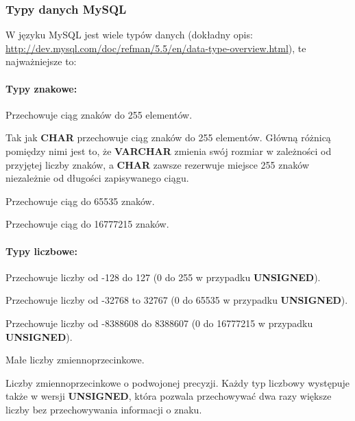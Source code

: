 \documentclass[a4paper,10pt]{article}
\renewenvironment{description}[1][0pt]
	{\list{}{\labelwidth=0pt \leftmargin=#1
	\let\makelabel\descriptionlabel}}
	{\endlist}
\begin{document}
\subsubsection{Typy danych MySQL}
W języku MySQL jest wiele typów danych 
(dokładny opis: \href{http://dev.mysql.com/doc/refman/5.5/en/data-type-overview.html}{http://dev.mysql.com/doc/refman/5.5/en/data-type-overview.html}), te najważniejsze to:

\paragraph{Typy znakowe:}
\begin{description}[5mm]
\item[CHAR] Przechowuje ciąg znaków do 255 elementów.
\item[VARCHAR] Tak jak \textbf{CHAR} przechowuje ciąg znaków do 255 elementów. Główną różnicą pomiędzy nimi jest to, że \textbf{VARCHAR} zmienia swój rozmiar w zależności od przyjętej liczby znaków, a \textbf{CHAR} zawsze rezerwuje miejsce 255 znaków niezależnie od długości zapisywanego ciągu.
\item[TEXT] Przechowuje ciąg do 65535 znaków.
\item[MEDIUMTEXT] Przechowuje ciąg do 16777215 znaków.
\end{description}

\paragraph{Typy liczbowe:}
\begin{description}[5mm]
\item[TINYINY] Przechowuje liczby od -128 do 127 (0 do 255 w przypadku \textbf{UNSIGNED}).
\item[SMALLINT] Przechowuje liczby od -32768 to 32767 (0 do 65535 w przypadku \textbf{UNSIGNED}).
\item[MEDIUMINT] Przechowuje liczby od -8388608 do 8388607 (0 do 16777215 w przypadku \textbf{UNSIGNED}).
\item[FLOAT] Małe liczby zmiennoprzecinkowe.
\item[DOUBLE] Liczby zmiennoprzecinkowe o podwojonej precyzji.
\end{description}
Każdy typ liczbowy występuje także w wersji \textbf{UNSIGNED}, która pozwala przechowywać dwa razy większe liczby bez przechowywania informacji o znaku.
\end{document}
